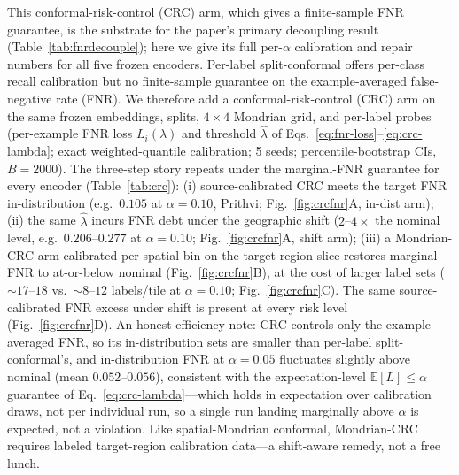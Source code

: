 \documentclass[preprint,11pt,authoryear]{elsarticle}
\begin{document}
This conformal-risk-control (CRC) arm, which gives a finite-sample FNR guarantee, is the substrate for the
paper's primary decoupling result (Table~\ref{tab:fnrdecouple}); here we give its full per-$\alpha$
calibration and repair numbers for all five frozen encoders. Per-label split-conformal offers per-class
recall calibration but no finite-sample guarantee on the example-averaged false-negative rate (FNR). We
therefore add a conformal-risk-control (CRC) arm \citep{angelopoulos2024crc} on the same frozen embeddings, splits,
$4\times4$ Mondrian grid, and per-label probes (per-example FNR loss $L_i(\lambda)$ and threshold
$\widehat{\lambda}$ of Eqs.~\eqref{eq:fnr-loss}--\eqref{eq:crc-lambda}; exact weighted-quantile calibration;
5 seeds; percentile-bootstrap CIs, $B{=}2000$). The three-step story
repeats under the marginal-FNR guarantee for every encoder (Table~\ref{tab:crc}): (i) source-calibrated CRC meets the
target FNR in-distribution (e.g.\ $0.105$ at $\alpha{=}0.10$, Prithvi; Fig.~\ref{fig:crcfnr}A, in-dist arm); (ii) the same $\widehat{\lambda}$ incurs
FNR debt under the geographic shift ($2$--$4\times$ the nominal level, e.g.\ $0.206$--$0.277$ at
$\alpha{=}0.10$; Fig.~\ref{fig:crcfnr}A, shift arm); (iii) a Mondrian-CRC arm calibrated per spatial bin on the target-region slice restores
marginal FNR to at-or-below nominal (Fig.~\ref{fig:crcfnr}B), at the cost of larger label sets (${\sim}17$--$18$ vs.\
${\sim}8$--$12$ labels/tile at $\alpha{=}0.10$; Fig.~\ref{fig:crcfnr}C). The same source-calibrated FNR excess under shift is present at every risk level (Fig.~\ref{fig:crcfnr}D). An honest efficiency note: CRC controls only the
example-averaged FNR, so its in-distribution sets are smaller than per-label split-conformal's, and
in-distribution FNR at $\alpha{=}0.05$ fluctuates slightly above nominal (mean $0.052$--$0.056$), consistent
with the expectation-level $\mathbb{E}[L]\le\alpha$ guarantee of Eq.~\eqref{eq:crc-lambda}---which holds in expectation over calibration
draws, not per individual run, so a single run landing marginally above $\alpha$ is expected, not a violation. Like spatial-Mondrian conformal, Mondrian-CRC
requires labeled target-region calibration data---a shift-aware remedy, not a free lunch.
\end{document}
